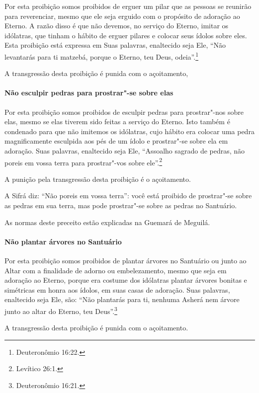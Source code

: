 \begin{multicols}{2}
Por esta proibição somos proibidos de erguer um pilar que as pessoas se
reunirão para reverenciar, mesmo que ele seja erguido com o propósito de
adoração ao Eterno. A razão disso é que não devemos, no serviço do
Eterno, imitar os idólatras, que tinham o hábito de erguer pilares e
colocar seus ídolos sobre eles. Esta proibição está expressa em Suas
palavras, enaltecido seja Ele, ``Não levantarás para ti matzebá\starr,
porque o Eterno, teu Deus, odeia''.\footnote{Deuteronômio 16:22.}

A transgressão desta proibição é punida com o açoitamento,

\paragraph{Não esculpir pedras para prostrar"-se sobre elas}

Por esta proibição somos proibidos de esculpir pedras para prostrar"-nos
sobre elas, mesmo se elas tiverem sido feitas a serviço do Eterno. Isto
também é condenado para que não imitemos os idólatras, cujo hábito era
colocar uma pedra magnificamente esculpida aos pés de um ídolo e prostrar"-se
sobre ela em adoração. Suas palavras, enaltecido seja Ele, ``Assoalho
sagrado de pedras, não poreis em vossa terra para prostrar"-vos sobre
ele''.\footnote{Levítico 26:1.}

A punição pela transgressão desta proibição é o açoitamento.

A Sifrá\starr{} diz: ``Não poreis em vossa terra'': você está proibido de
prostrar"-se sobre as pedras em sua terra, mas pode prostrar"-se sobre as
pedras no Santuário.

As normas deste preceito estão explicadas na Guemará\starr{} de Meguilá\starr.

\paragraph{Não plantar árvores no Santuário}

Por esta proibição somos proibidos de plantar árvores no Santuário ou
junto ao Altar com a finalidade de adorno ou embelezamento, mesmo que
seja em adoração ao Eterno, porque era costume dos idólatras plantar
árvores bonitas e simétricas em honra aos ídolos, em suas casas de
adoração. Suas palavras, enaltecido seja Ele, são: ``Não plantarás para
ti, nenhuma Asherá\starr{} nem árvore junto ao altar do Eterno, teu Deus''.\footnote{Deuteronômio 16:21.}

A transgressão desta proibição é punida com o açoitamento.


\end{multicols}
